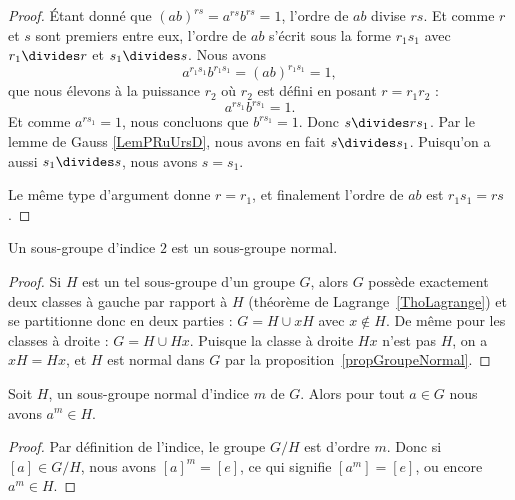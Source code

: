 \begin{proof}
	Étant donné que \( (ab)^{rs}=a^{rs}b^{rs}=1\), l'ordre de \( ab\) divise \( rs\). Et comme \( r\) et \( s\) sont premiers entre eux, l'ordre de \( ab\) s'écrit sous la forme \( r_1s_1\) avec \( r_1\divides r\) et \( s_1\divides s\). Nous avons
	\begin{equation}
		a^{r_1s_1}b^{r_1s_1}=(ab)^{r_1s_1}=1,
	\end{equation}
	que nous élevons à la puissance \( r_2\) où \( r_2\) est défini en posant \(r=r_1r_2\) :
	\begin{equation}
		a^{rs_1}b^{rs_1}=1.
	\end{equation}
	Et comme \( a^{rs_1}=1\), nous concluons que \( b^{rs_1}=1\). Donc \( s\divides rs_1\). Par le lemme de Gauss \ref{LemPRuUrsD}, nous avons en fait \( s\divides s_1\). Puisqu'on a aussi \( s_1\divides s\), nous avons \( s=s_1\).

	Le même type d'argument donne \( r=r_1\), et finalement l'ordre de \( ab\) est \( r_1s_1=rs\).
\end{proof}

\begin{lemma}    \label{LemSkIOOG}
	Un sous-groupe d'indice \( 2\) est un sous-groupe normal.
\end{lemma}

\begin{proof}
	Si \( H\) est un tel sous-groupe d'un groupe \( G\), alors \( G\) possède exactement deux classes à gauche par rapport à \( H\) (théorème de Lagrange~\ref{ThoLagrange}) et se partitionne donc en deux parties : \( G=H\cup xH\) avec \( x \notin H \). De même pour les classes à droite : \( G=H\cup Hx\). Puisque la classe à droite \( Hx \) n'est pas \( H\), on a \( xH = Hx \), et \( H\) est normal dans \( G\) par la proposition~\ref{propGroupeNormal}.
\end{proof}

\begin{lemma}\label{PropubeiGX}
	Soit \( H\), un sous-groupe normal d'indice \( m\) de \( G\). Alors pour tout \( a\in G\) nous avons \( a^m\in H\).
\end{lemma}

\begin{proof}
	Par définition de l'indice, le groupe \( G/H\) est d'ordre \( m\). Donc si \( [a]\in G/H\), nous avons \( [a]^m=[e]\), ce qui signifie \( [a^m]=[e]\), ou encore \( a^m\in H\).
\end{proof}

